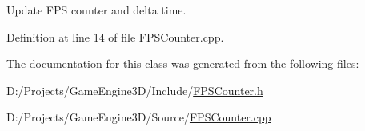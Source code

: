 Update F\+PS counter and delta time. 

Definition at line 14 of file F\+P\+S\+Counter.\+cpp.



The documentation for this class was generated from the following files\+:\begin{DoxyCompactItemize}
\item 
D\+:/\+Projects/\+Game\+Engine3\+D/\+Include/\mbox{\hyperlink{_f_p_s_counter_8h}{F\+P\+S\+Counter.\+h}}\item 
D\+:/\+Projects/\+Game\+Engine3\+D/\+Source/\mbox{\hyperlink{_f_p_s_counter_8cpp}{F\+P\+S\+Counter.\+cpp}}\end{DoxyCompactItemize}

